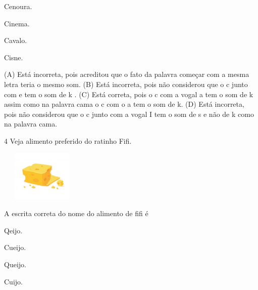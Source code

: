 \begin{minipage}{.5\textwidth}
\begin{escolha}
\item Cenoura.

\item Cinema.

\item Cavalo.

\item Cisne.
\end{escolha}
\end{minipage}

(A) Está incorreta, pois acreditou que o fato da palavra começar com a
mesma letra teria o mesmo som.
(B) Está incorreta, pois não considerou que o c junto com e tem o som de k .
(C) Está correta, pois o c com a vogal a tem o som de k assim como na
palavra cama o c com o a tem o som de k.
(D) Está incorreta, pois não considerou que o c junto com a vogal I tem
o som de s e não de k como na palavra cama.

\num{4} Veja alimento preferido do ratinho Fifi.

\includegraphics[width=1.56736in,height=0.94861in]{media/image141.jpeg}


A escrita correta do nome do alimento de fifi é

\begin{minipage}{.5\textwidth}
\begin{escolha}
\item Qeijo.

\item Cueijo.

\item Queijo.

\item Cuijo.
\end{escolha}
\end{minipage}

